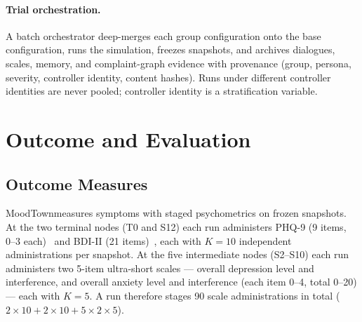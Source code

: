 \documentclass[10pt]{article}
\newcommand{\sys}{MoodTown}
\begin{document}
\paragraph{Trial orchestration.}
A batch orchestrator deep-merges each group configuration onto the base configuration, runs the simulation, freezes snapshots, and archives dialogues, scales, memory, and complaint-graph evidence with provenance (group, persona, severity, controller identity, content hashes).
Runs under different controller identities are never pooled; controller identity is a stratification variable.

\section{Outcome and Evaluation}\label{sec:outcome}

\subsection{Outcome Measures}\label{sec:outcomes}

\sys measures symptoms with staged psychometrics on frozen snapshots.
At the two terminal nodes (T0 and S12) each run administers PHQ-9 (9 items, 0--3 each)~\citep{kroenke2001} and BDI-II (21 items)~\citep{beck1996}, each with $K=10$ independent administrations per snapshot.
At the five intermediate nodes (S2--S10) each run administers two 5-item ultra-short scales --- overall depression level and interference, and overall anxiety level and interference (each item 0--4, total 0--20) --- each with $K=5$.
A run therefore stages 90 scale administrations in total ($2 \times 10 + 2 \times 10 + 5 \times 2 \times 5$).
\end{document}
